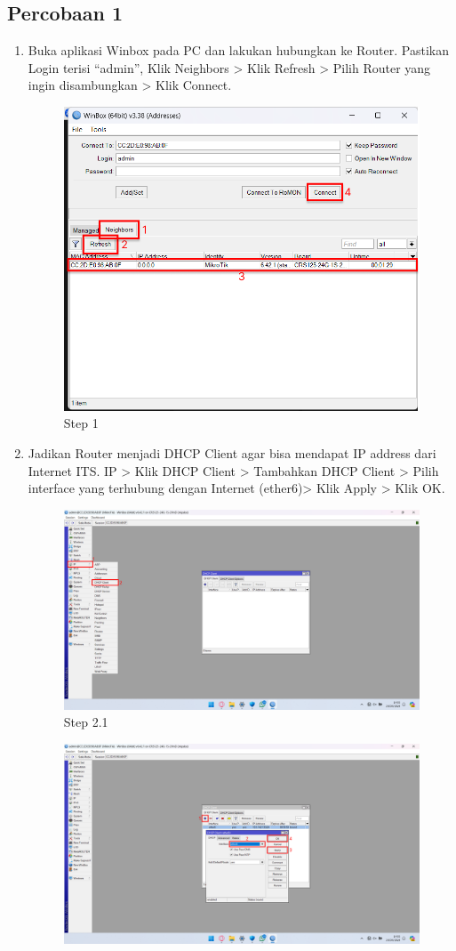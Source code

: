 \subsection{Percobaan 1}
\begin{center}
    \begin{enumerate}
        \item Buka aplikasi Winbox pada PC dan lakukan hubungkan ke Router. Pastikan Login terisi “admin”, Klik Neighbors > Klik Refresh > Pilih Router yang ingin disambungkan > Klik Connect.
        \begin{figure}[H]
			\centering
			\includegraphics[width=0.5\linewidth]{P3/img/Step 1.png}
			\caption{Step 1}
			\label{fig:Step 1}
		\end{figure}
        \item Jadikan Router menjadi DHCP Client agar bisa mendapat IP address dari Internet ITS. IP > Klik DHCP Client > Tambahkan DHCP Client > Pilih interface yang terhubung dengan Internet (ether6)> Klik Apply > Klik OK.
        \begin{figure}[H]
			\centering
			\includegraphics[width=0.8\linewidth]{P3/img/Step 2.1.png}
			\caption{Step 2.1}
			\label{fig:Step 2.1}
		\end{figure}
        \begin{figure}[H]
			\centering
			\includegraphics[width=0.8\linewidth]{P3/img/Step 2.2.png}

\end{figure}
\end{enumerate}
\end{center}
